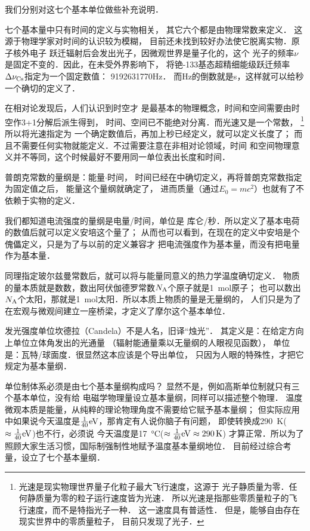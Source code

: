 我们分别对这七个基本单位做些补充说明．


\noindent{}七个基本量中只有时间的定义与实物相关，
其它六个都是由物理常数来定义．
这源于物理学家对时间的认识较为模糊，
目前还未找到较好办法使它脱离实物．原子核外电子
跃迁辐射后会发出光子，因微观世界是量子化的，这个
光子的频率$\nu$是固定不变的．因此，在未受外界影响下，
将铯-133基态超精细能级跃迁频率$\Delta\nu_{\rm Cs}$指定为一个固定数值：
\num{9192631770}\si{Hz}．
而\si{Hz}的倒数就是\si{s}，这样就可以给{\heiti 秒}一个确切的定义了．

\noindent{}在相对论发现后，人们认识到{\kaishu 时空}才
是最基本的物理概念，时间和空间需要由时空作3+1分解后派生得到，
时间、空间已不能绝对分离．而光速又是一个常数，
{\footnote{光速是现实物理世界量子化粒子最大飞行速度，这源于
光子静质量为零．任何静质量为零的粒子运行速度皆为光速．
所以光速是指那些零质量粒子的飞行速度，而不是特指光子一种．
这一速度具有普适性．
但是，能够自由存在现实世界中的零质量粒子，
目前只发现了光子．}}
所以将光速指定为
一个确定数值后，再加上{\kaishu 秒}已经定义，就可以定义长度了；
而且不需要任何实物就能定义．不过需要注意在非相对论领域，时间
和空间物理意义并不等同，这个时候最好不要用同一单位表出长度和时间．

\noindent{}普朗克常数的量纲是：{\kaishu 能量$\cdot$时间}，
时间已经在中确切定义，再将普朗克常数指定为固定值之后，
{\kaishu 能量}这个量纲就确定了，
进而质量（通过$E_0=mc^2$）也就有了不依赖于实物的定义．


\noindent{}我们都知道电流强度的量纲是{\kaishu 电量/时间}，单位是
{\kaishu 库仑/秒}．所以定义了基本电荷的数值后就可以定义安培这个量了；
从而也可以看到，在现在的定义中安培是个傀儡定义，只是为了与以前的定义兼容才
把电流强度作为基本量，而没有把电量作为基本量．

\noindent{}同理指定玻尔兹曼常数后，就可以将与能量同意义的热力学温度确切定义．
物质的量本质就是数数，数出阿伏伽德罗常数$N_{\rm A}$个原子就是\SI{1}{mol}原子；
也可以数出$N_{\rm A}$个太阳，那就是\SI{1}{mol}太阳．所以本质上物质的量是无量纲的，
人们只是为了在宏观与微观间建立一座桥梁，才定义了{\kaishu 摩尔}这个基本单位．

\noindent{}发光强度单位坎德拉（Candela）不是人名，旧译“烛光”．
其定义是：在给定方向上单位立体角发出的光通量
（辐射能通量乘以无量纲的人眼{\heiti 视见函数}），
单位是：{\kaishu 瓦特/球面度}．很显然这本应该是个导出单位，
只因为人眼的特殊性，才把它规定为基本量纲．


\noindent{}单位制体系必须是由七个基本量纲构成吗？
显然不是，例如高斯单位制就只有三个基本单位，没有给
电磁学物理量设立基本量纲，同样可以描述整个物理．
温度微观本质是能量，从纯粹的理论物理角度不需要给它赋予基本量纲；
但实际应用中如果说今天温度是$\frac{1}{40}{\rm eV}$，那肯定有人说你脑子有问题，
即使转换成\SI{290}{K}($\approx \frac{1}{40}{\rm eV}$)也不行，必须说
今天温度是\SI{17}{\degreeCelsius}($\approx \frac{1}{40}{\rm eV} \approx \SI{290}{K}$)
才算正常．所以为了照顾大家生活习惯，国际制强制性地赋予温度基本量纲地位．
目前经过综合考量，设立了七个基本量纲．

